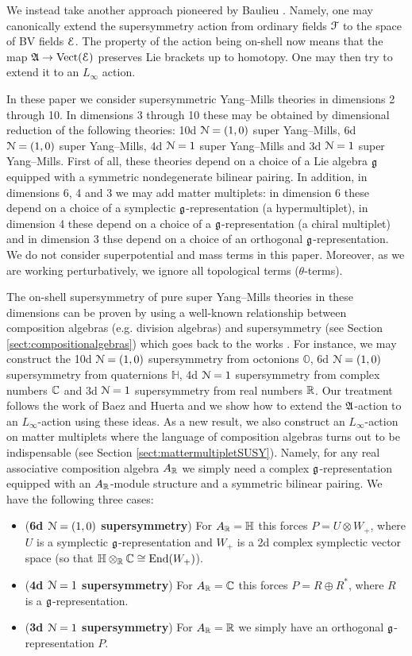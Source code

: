 \documentclass[10pt, oneside]{article}
\begin{document}
We instead take another approach pioneered by Baulieu \cite{BaulieuBV}. Namely, one may canonically extend the supersymmetry action from ordinary fields $\mathcal F$ to the space of BV fields $\mathcal E$. The property of the action being on-shell now means that the map $\mathfrak A\rightarrow \mathrm{Vect}(\mathcal E)$ preserves Lie brackets up to homotopy. One may then try to extend it to an $L_\infty$ action.

In these paper we consider supersymmetric Yang--Mills theories in dimensions 2 through 10. In dimensions 3 through 10 these may be obtained by dimensional reduction of the following theories: 10d $\mathcal N=(1, 0)$ super Yang--Mills, 6d $\mathcal N=(1, 0)$ super Yang--Mills, 4d $\mathcal N=1$ super Yang--Mills and 3d $\mathcal N=1$ super Yang--Mills. First of all, these theories depend on a choice of a Lie algebra $\mathfrak g$ equipped with a symmetric nondegenerate bilinear pairing. In addition, in dimensions 6, 4 and 3 we may add matter multiplets: in dimension 6 these depend on a choice of a symplectic $\mathfrak g$-representation (a hypermultiplet), in dimension 4 these depend on a choice of a $\mathfrak g$-representation (a chiral multiplet) and in dimension 3 thse depend on a choice of an orthogonal $\mathfrak g$-representation. We do not consider superpotential and mass terms in this paper. Moreover, as we are working perturbatively, we ignore all topological terms ($\theta$-terms).

The on-shell supersymmetry of pure super Yang--Mills theories in these dimensions can be proven by using a well-known relationship between composition algebras (e.g. division algebras) and supersymmetry (see Section \ref{sect:compositionalgebras}) which goes back to the works \cite{Evans,KugoTownsend}. For instance, we may construct the 10d $\mathcal N=(1, 0)$ supersymmetry from octonions $\mathbb{O}$, 6d $\mathcal N=(1, 0)$ supersymmetry from quaternions $\mathbb{H}$, 4d $\mathcal N=1$ supersymmetry from complex numbers $\mathbb C$ and 3d $\mathcal N=1$ supersymmetry from real numbers $\mathbb R$. Our treatment follows the work of Baez and Huerta \cite{BaezHuerta} and we show how to extend the $\mathfrak A$-action to an $L_\infty$-action using these ideas. As a new result, we also construct an $L_\infty$-action on matter multiplets where the language of composition algebras turns out to be indispensable (see Section \ref{sect:mattermultipletSUSY}). Namely, for any real associative composition algebra $A_\mathbb R$ we simply need a complex $\mathfrak g$-representation equipped with an $A_\mathbb R$-module structure and a symmetric bilinear pairing. We have the following three cases:
\begin{itemize}
\item (\textbf{6d $\mathcal N=(1, 0)$ supersymmetry}) For $A_\mathbb R=\mathbb{H}$ this forces $P=U\otimes W_+$, where $U$ is a symplectic $\mathfrak g$-representation and $W_+$ is a 2d complex symplectic vector space (so that $\mathbb{H}\otimes_\mathbb R\mathbb C\cong \operatorname{End}(W_+)$).
\item (\textbf{4d $\mathcal N=1$ supersymmetry}) For $A_\mathbb R=\mathbb{C}$ this forces $P=R\oplus R^*$, where $R$ is a $\mathfrak g$-representation.
\item (\textbf{3d $\mathcal N=1$ supersymmetry}) For $A_\mathbb R=\mathbb{R}$ we simply have an orthogonal $\mathfrak g$-representation $P$.
\end{itemize}
\end{document}
